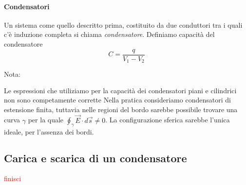 \documentclass[x11names]{report}
\newcommand{\nota}[2]{
	\begin{attenzione}{Nota:}
		#2
	\end{attenzione}
}
\begin{document}
\paragraph{Condensatori}
Un sistema come quello descritto prima, costituito da due conduttori tra i quali c'è induzione completa si chiama \textit{condensatore}. Definiamo capacità del condensatore 
\begin{equation}
	C = \frac{q}{V_1 - V_2}
\end{equation}

\nota{}{
Le espressioni che utiliziamo per la capacità dei condensatori piani e cilindrici non sono competamente corrette Nella pratica consideriamo condensatori di estensione finita, tuttavia nelle regioni del bordo sarebbe possibile trovare una curva \(\gamma\) per la quale \(\oint_\gamma \vec{E}\cdot d\vec{s} \neq 0\). La configurazione sferica sarebbe l'unica ideale, per l'assenza dei bordi.
}

\subsection{Carica e scarica di un condensatore}
\begin{center}
	\textcolor{red}{finisci}
\end{center}
\end{document}

